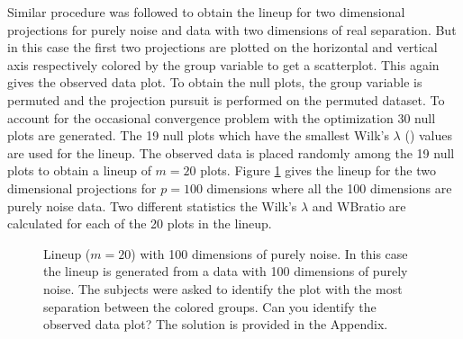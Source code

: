 Similar procedure was followed to obtain the lineup  for two dimensional projections for purely noise and data with two dimensions of real separation. But in this case the first two projections are plotted on the horizontal and vertical axis respectively colored by the group variable to get a scatterplot. This again gives the observed data plot. To obtain the null plots, the group variable is permuted and the projection pursuit is performed on the permuted dataset. To account for the occasional convergence problem with the optimization 30 null plots are generated. The 19 null plots which have the smallest Wilk's $\lambda$  (\cite{JW02}) values are used for the lineup. The observed data is placed randomly among the 19 null plots to obtain a lineup of $m = 20$ plots. Figure \ref{fig:test_category} gives the lineup  for the two dimensional projections for $p =100$ dimensions where all the 100 dimensions are purely noise data. Two different statistics the Wilk's $\lambda$ and WBratio are calculated for each of the 20 plots in the lineup. 
 
\begin{figure}[hbtp]
       \caption{Lineup  ($m=20$) with 100 dimensions of purely noise. In this case the lineup is generated from a data with 100 dimensions of purely noise. The subjects were asked to identify the plot with the most separation between the colored groups. Can you identify the observed data plot? The solution is provided in the Appendix. }
       \label{fig:test_category}
\end{figure}

